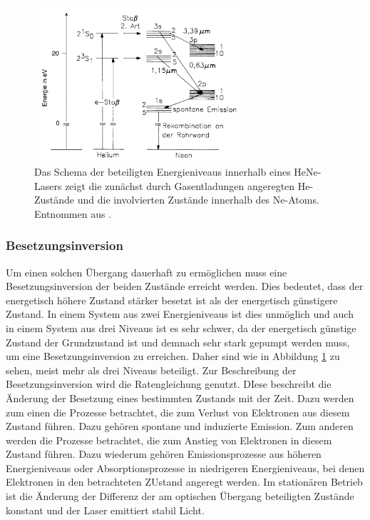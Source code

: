             \begin{figure}[h]
                \centering
                \includegraphics[width = 0.7\textwidth]{pictures/Termschema.png}
                \caption{Das Schema der beteiligten Energieniveaus innerhalb eines HeNe-Lasers zeigt die zunächst durch Gasentladungen angeregten He-Zustände und die involvierten Zustände innerhalb des Ne-Atoms. Entnommen aus \cite{eichler_laser_2015}.}
                \label{fig:termschema}
            \end{figure}
            

        \subsubsection{Besetzungsinversion}
            Um einen solchen Übergang dauerhaft zu ermöglichen muss eine Besetzungsinversion der beiden Zustände erreicht werden. Dies bedeutet, dass der energetisch höhere Zustand stärker besetzt ist als der 
            energetisch günstigere Zustand. In einem System aus zwei Energieniveaus ist dies unmöglich und auch in einem System aus drei Niveaus ist es sehr schwer, da der energetisch günstige Zustand der 
            Grundzustand ist und demnach sehr stark gepumpt werden muss, um eine Besetzungsinversion zu erreichen. Daher sind wie in Abbildung \ref{fig:termschema} zu sehen, meist mehr als drei Niveaus 
            beteiligt. Zur Beschreibung der Besetzungsinversion wird die Ratengleichung genutzt. DIese beschreibt die Änderung der Besetzung eines bestimmten Zustands mit der Zeit. Dazu werden zum einen die 
            Prozesse betrachtet, die zum Verlust von Elektronen aus diesem Zustand führen. Dazu gehören spontane und induzierte Emission. Zum anderen werden die Prozesse betrachtet, die zum Anstieg von 
            Elektronen in diesem Zustand führen. Dazu wiederum gehören Emissionsprozesse aus höheren Energieniveaus oder Absorptionsprozesse in niedrigeren Energieniveaus, bei denen Elektronen in den betrachteten
            ZUstand angeregt werden. Im stationären Betrieb ist die Änderung der Differenz der am optischen Übergang beteiligten Zustände konstant und der Laser emittiert stabil Licht.      


